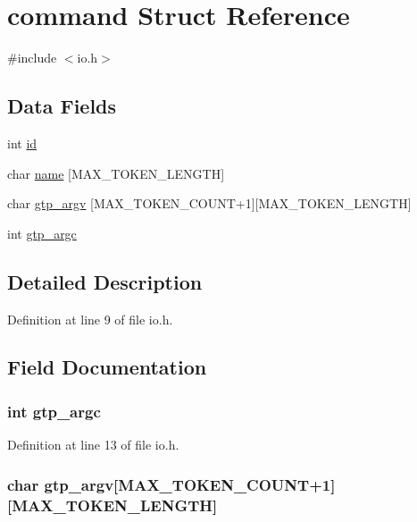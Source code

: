 \hypertarget{structcommand}{
\section{command Struct Reference}
\label{structcommand}
}


{\ttfamily \#include $<$io.h$>$}

\subsection*{Data Fields}
\begin{DoxyCompactItemize}
\item 
int \hyperlink{structcommand_a7441ef0865bcb3db9b8064dd7375c1ea}{id}
\item 
char \hyperlink{structcommand_ac0b9897814a00cff684163a205d092b4}{name} \mbox{[}MAX\_\-TOKEN\_\-LENGTH\mbox{]}
\item 
char \hyperlink{structcommand_aad4787c27c68e4bb76cfca730a8db9e0}{gtp\_\-argv} \mbox{[}MAX\_\-TOKEN\_\-COUNT+1\mbox{]}\mbox{[}MAX\_\-TOKEN\_\-LENGTH\mbox{]}
\item 
int \hyperlink{structcommand_a27d38bda7ae19f88a83100379e972da9}{gtp\_\-argc}
\end{DoxyCompactItemize}


\subsection{Detailed Description}


Definition at line 9 of file io.h.



\subsection{Field Documentation}
\hypertarget{structcommand_a27d38bda7ae19f88a83100379e972da9}{
\subsubsection[{gtp\_\-argc}]{\setlength{\rightskip}{0pt plus 5cm}int {\bf gtp\_\-argc}}}
\label{structcommand_a27d38bda7ae19f88a83100379e972da9}


Definition at line 13 of file io.h.

\hypertarget{structcommand_aad4787c27c68e4bb76cfca730a8db9e0}{
\subsubsection[{gtp\_\-argv}]{\setlength{\rightskip}{0pt plus 5cm}char {\bf gtp\_\-argv}\mbox{[}MAX\_\-TOKEN\_\-COUNT+1\mbox{]}\mbox{[}MAX\_\-TOKEN\_\-LENGTH\mbox{]}}}
\label{structcommand_aad4787c27c68e4bb76cfca730a8db9e0}


